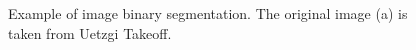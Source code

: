 \begin{figure}[!h]
	\centering
    \caption[Example of binary image segmentation]{Example of image binary segmentation. The original image (a) is taken from Uetzgi Takeoff.}
	\label{fig:eg01imgseg}
\end{figure}